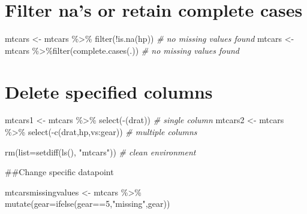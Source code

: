 \documentclass[
]{book}
\newenvironment{Shaded}{\begin{snugshade}}{\end{snugshade}}
\newcommand{\AttributeTok}[1]{\textcolor[rgb]{0.77,0.63,0.00}{#1}}
\newcommand{\CommentTok}[1]{\textcolor[rgb]{0.56,0.35,0.01}{\textit{#1}}}
\newcommand{\DecValTok}[1]{\textcolor[rgb]{0.00,0.00,0.81}{#1}}
\newcommand{\FunctionTok}[1]{\textcolor[rgb]{0.00,0.00,0.00}{#1}}
\newcommand{\NormalTok}[1]{#1}
\newcommand{\OtherTok}[1]{\textcolor[rgb]{0.56,0.35,0.01}{#1}}
\newcommand{\SpecialCharTok}[1]{\textcolor[rgb]{0.00,0.00,0.00}{#1}}
\newcommand{\StringTok}[1]{\textcolor[rgb]{0.31,0.60,0.02}{#1}}
\begin{document}
\hypertarget{filter-nas-or-retain-complete-cases}{%
\section{Filter na's or retain complete cases}\label{filter-nas-or-retain-complete-cases}}

\begin{Shaded}
\begin{Highlighting}[]
\NormalTok{mtcars }\OtherTok{\textless{}{-}}\NormalTok{ mtcars }\SpecialCharTok{\%\textgreater{}\%} \FunctionTok{filter}\NormalTok{(}\SpecialCharTok{!}\FunctionTok{is.na}\NormalTok{(hp)) }\CommentTok{\# no missing values found}
\NormalTok{mtcars }\OtherTok{\textless{}{-}}\NormalTok{ mtcars }\SpecialCharTok{\%\textgreater{}\%}\FunctionTok{filter}\NormalTok{(}\FunctionTok{complete.cases}\NormalTok{(.)) }\CommentTok{\# no missing values found}
\end{Highlighting}
\end{Shaded}

\hypertarget{delete-specified-columns}{%
\section{Delete specified columns}\label{delete-specified-columns}}

\begin{Shaded}
\begin{Highlighting}[]
\NormalTok{mtcars1 }\OtherTok{\textless{}{-}}\NormalTok{ mtcars }\SpecialCharTok{\%\textgreater{}\%} \FunctionTok{select}\NormalTok{(}\SpecialCharTok{{-}}\NormalTok{(drat)) }\CommentTok{\# single column}
\NormalTok{mtcars2 }\OtherTok{\textless{}{-}}\NormalTok{ mtcars }\SpecialCharTok{\%\textgreater{}\%} \FunctionTok{select}\NormalTok{(}\SpecialCharTok{{-}}\FunctionTok{c}\NormalTok{(drat,hp,vs}\SpecialCharTok{:}\NormalTok{gear)) }\CommentTok{\# multiple columns}

\FunctionTok{rm}\NormalTok{(}\AttributeTok{list=}\FunctionTok{setdiff}\NormalTok{(}\FunctionTok{ls}\NormalTok{(), }\StringTok{"mtcars"}\NormalTok{)) }\CommentTok{\# clean environment}
\end{Highlighting}
\end{Shaded}

\#\#Change specific datapoint

\begin{Shaded}
\begin{Highlighting}[]
\NormalTok{mtcarsmissingvalues }\OtherTok{\textless{}{-}}\NormalTok{ mtcars }\SpecialCharTok{\%\textgreater{}\%} \FunctionTok{mutate}\NormalTok{(}\AttributeTok{gear=}\FunctionTok{ifelse}\NormalTok{(gear}\SpecialCharTok{==}\DecValTok{5}\NormalTok{,}\StringTok{"missing"}\NormalTok{,gear))}
\end{Highlighting}
\end{Shaded}
\end{document}
